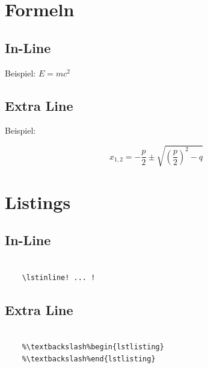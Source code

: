 \section{Formeln}

\subsection{In-Line}
\begin{frame}{\subsecname}

  Beispiel: \( E = mc^2 \)

\end{frame}

\subsection{Extra Line}
\begin{frame}{\subsecname}

  Beispiel:

  \begin{equation*}
    x_{1,2} = -\frac{p}{2} \pm \sqrt{ \left( \frac{p}{2} \right)^2 - q }
  \end{equation*}

\end{frame}

\section{Listings}

\subsection{In-Line}
\begin{frame}[fragile]{\subsecname}

  \begin{lstlisting}[gobble=4]
    % Option [fragile] ist erforderlich!

    \lstinline! ... !
  \end{lstlisting}

\end{frame}

\subsection{Extra Line}
\begin{frame}[fragile]{\subsecname}

  \begin{lstlisting}[gobble=4,escapechar=\%]
    %\%% Option [fragile] ist erforderlich!

    %\textbackslash%begin{lstlisting}
    %\textbackslash%end{lstlisting}
  \end{lstlisting}

\end{frame}

